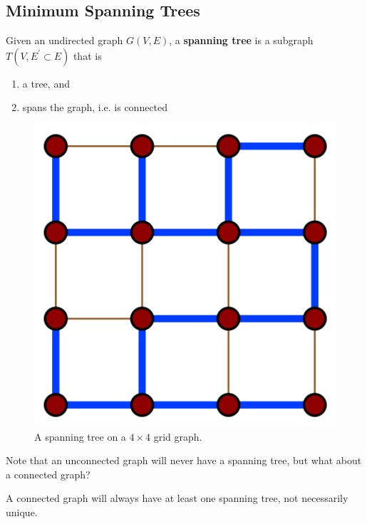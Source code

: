 \documentclass{article}
\begin{document}
  \subsection{Minimum Spanning Trees} 

      \begin{definition}
        Given an undirected graph $G(V, E)$, a \textbf{spanning tree} is a subgraph $T(V, E^\prime \subset E)$ that is 
        \begin{enumerate}
          \item a tree, and 
          \item spans the graph, i.e. is connected 
        \end{enumerate}

        \begin{figure}[H]
          \centering 
          \includegraphics[scale=0.3]{img/spanning_tree.png}
          \caption{A spanning tree on a $4 \times 4$ grid graph. } 
          \label{fig:spanning_tree}
        \end{figure}
      \end{definition}

      Note that an unconnected graph will never have a spanning tree, but what about a connected graph? 

      \begin{theorem}
        A connected graph will always have at least one spanning tree, not necessarily unique. 
      \end{theorem}
\end{document}
